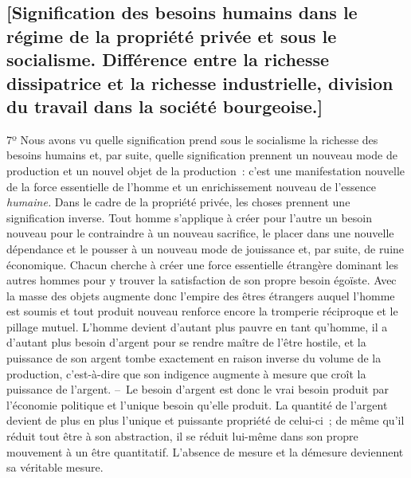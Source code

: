 \documentclass[french,twoside]{book} %
\begin{document}
\subsection[{[Signification des besoins humains dans le régime de la propriété privée et sous le socialisme. Différence entre la richesse dissipatrice et la richesse industrielle, division du travail dans la société bourgeoise.]}]{[Signification des besoins humains dans le régime de la propriété privée et sous le socialisme. Différence entre la richesse dissipatrice et la richesse industrielle, division du travail dans la société bourgeoise.]}
\noindent [XIV] 7º Nous avons vu quelle signification prend sous le socialisme la richesse des besoins humains et, par suite, quelle signification prennent un nouveau mode de production et un nouvel objet de la production : c’est une manifestation nouvelle de la force essentielle de l’homme et un enrichissement nouveau de l’essence \emph{humaine.} Dans le cadre de la propriété privée, les choses prennent une signification inverse. Tout homme s’applique à créer pour l’autre un besoin nouveau pour le contraindre à un nouveau sacrifice, le placer dans une nouvelle dépendance et le pousser à un nouveau mode de jouissance et, par suite, de ruine économique. Chacun cherche à créer une force essentielle étrangère dominant les autres hommes pour y trouver la satisfaction de son propre besoin égoïste. Avec la masse des objets augmente donc l’empire des êtres étrangers auquel l’homme est soumis et tout produit nouveau renforce encore la tromperie réciproque et le pillage mutuel. L’homme devient d’autant plus pauvre en tant qu’homme, il a d’autant plus besoin d’argent pour se rendre maître de l’être hostile, et la puissance de son argent tombe exactement en raison inverse du volume de la production, c’est-à-dire que son indigence augmente à mesure que croît la puissance de l’argent. – Le besoin d’argent est donc le vrai besoin produit par l’économie politique et l’unique besoin qu’elle produit. La quantité de l’argent devient de plus en plus l’unique et puissante propriété de celui-ci ; de même qu’il réduit tout être à son abstraction, il se réduit lui-même dans son propre mouvement à un être quantitatif. L’absence de mesure et la démesure deviennent sa véritable mesure.\par
\end{document}
